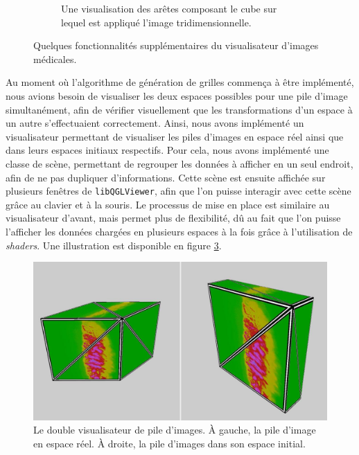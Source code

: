 {{{\begin{figure}[h]
\begin{subfigure}{.45\linewidth}
                    \captionsetup{width=.9\linewidth}
                    \caption{Une visualisation des arêtes composant le cube sur lequel est appliqué l'image tridimensionnelle.}
                    \label{img:visualisateur:functions:wireframe}
                \end{subfigure}
                \captionsetup{width=.8\linewidth}
                \caption{Quelques fonctionnalités supplémentaires du visualisateur d'images médicales.}
                \label{img:visualisateur:functions}
            \end{figure}

            Au moment où l'algorithme de génération de grilles commença à être implémenté, nous avions besoin de visualiser les deux espaces possibles pour une pile d'image simultanément, afin de vérifier visuellement que les transformations d'un espace à un autre s'effectuaient correctement. Ainsi, nous avons implémenté un visualisateur permettant de visualiser les piles d'images en espace réel ainsi que dans leurs espaces initiaux respectifs. Pour cela, nous avons implémenté une classe de scène, permettant de regrouper les données à afficher en un seul endroit, afin de ne pas dupliquer d'informations. Cette scène est ensuite affichée sur plusieurs fenêtres de \texttt{libQGLViewer}, afin que l'on puisse interagir avec cette scène grâce au clavier et à la souris. Le processus de mise en place est similaire au visualisateur d'avant, mais permet plus de flexibilité, dû au fait que l'on puisse l'afficher les données chargées en plusieurs espaces à la fois grâce à l'utilisation de \textit{shaders}. Une illustration est disponible en figure \ref{img:visualisateur:double}.

            \begin{figure}[h]
                \centering
                \includegraphics[width=.9\linewidth]{img/visu_screens/double_view_01.jpg}
                \captionsetup{width=.9\linewidth}
                \caption{Le double visualisateur de pile d'images. À gauche, la pile d'image en espace réel. À droite, la pile d'images dans son espace initial.}
                \label{img:visualisateur:double}
            \end{figure}

}}}
